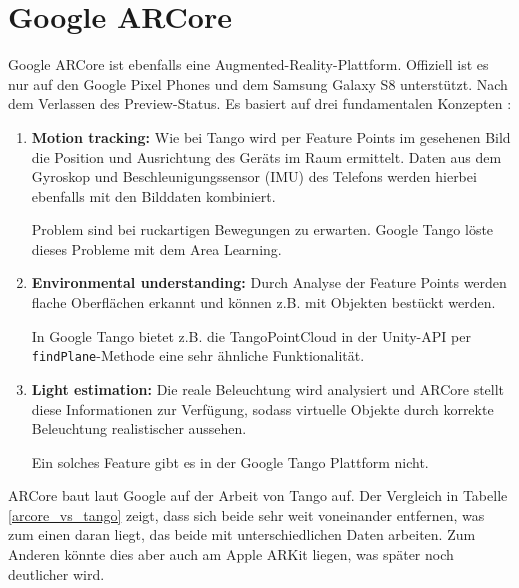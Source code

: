 
\section{Google ARCore}
Google ARCore ist ebenfalls eine Augmented-Reality-Plattform. Offiziell ist es nur auf den Google Pixel Phones und dem Samsung Galaxy S8 unterstützt. Nach dem Verlassen des Preview-Status. Es basiert auf drei fundamentalen Konzepten \cite{arcore_overview}:
\begin{enumerate}
	\item \textbf{Motion tracking:} Wie bei Tango wird per Feature Points im gesehenen Bild die Position und Ausrichtung des Geräts im Raum ermittelt. Daten aus dem Gyroskop und Beschleunigungssensor (IMU) des Telefons werden hierbei ebenfalls mit den Bilddaten kombiniert. \cite{arcore_fundamentals}\par
	Problem sind bei ruckartigen Bewegungen zu erwarten. Google Tango löste dieses Probleme mit dem Area Learning.
	\item \textbf{Environmental understanding:}  Durch Analyse der Feature Points werden flache Oberflächen erkannt und können z.B. mit Objekten bestückt werden. \cite{arcore_fundamentals}\par
	In Google Tango bietet z.B. die TangoPointCloud in der Unity-API per \texttt{findPlane}-Methode eine sehr ähnliche Funktionalität.
	\item \textbf{Light estimation:} Die reale Beleuchtung wird analysiert und ARCore stellt diese Informationen zur Verfügung, sodass virtuelle Objekte durch korrekte Beleuchtung realistischer aussehen. \cite{arcore_fundamentals}\par
	Ein solches Feature gibt es in der Google Tango Plattform nicht.\\
\end{enumerate}

ARCore baut laut Google auf der Arbeit von Tango auf. Der Vergleich in Tabelle \ref{arcore_vs_tango} zeigt, dass sich beide sehr weit voneinander entfernen, was zum einen daran liegt, das beide mit unterschiedlichen Daten arbeiten. Zum Anderen könnte dies aber auch am Apple ARKit liegen, was später noch deutlicher wird.

